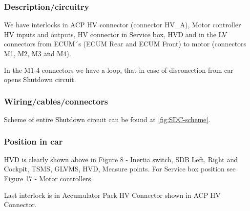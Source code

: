 \subsubsection{Description/circuitry}
\iffalse Describe the concept and circuitry of the Shutdown System Interlocks.
Note: Interlocks are circuits used to open the shutdown circuit if a connector is disconnected or enclosure is opened.  This is not the entire shutdown circuit.\fi

We have interlocks in ACP HV connector (connector HV\_A), Motor controller HV inputs and outputs, HV connector in Service box, HVD and in the LV connectors from ECUM´s (ECUM Rear and ECUM Front) to motor (connectors M1, M2, M3 and M4). 


In the M1-4 connectors we have a loop, that in case of disconection from car opens Shutdown circuit.

\subsubsection{Wiring/cables/connectors}

Scheme of entire Shutdown circuit can be found at \ref{fig:SDC-scheme}.

\subsubsection{Position in car}
HVD is clearly shown above in Figure 8 - Inertia switch, SDB Left, Right and Cockpit, TSMS, GLVMS, HVD, Measure points. For Service box position see Figure 17 - Motor controllers

Last interlock is in Accumulator Pack HV Connector shown in ACP HV Connector.